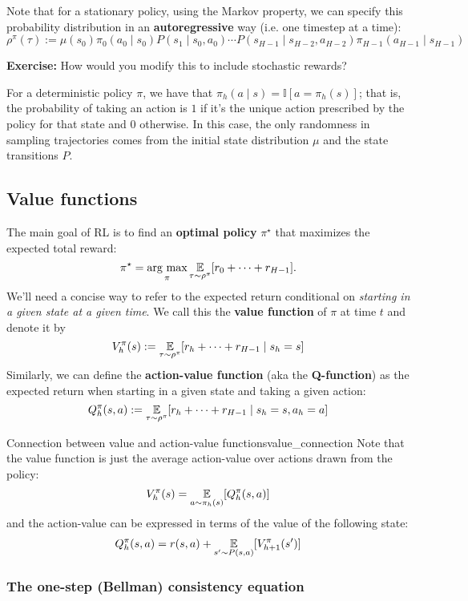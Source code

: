 \documentclass[../main/main]{subfiles}
\begin{document}
Note that for a stationary policy, using the Markov property, we can specify this probability distribution in an \textbf{autoregressive} way (i.e. one timestep at a time):
\[
    \rho^{\pi}(\tau) := \mu(s_0) \pi_0(a_0 \mid s_0) P(s_1 \mid s_0, a_0) \cdots P(s_{H-1} \mid s_{H-2}, a_{H-2}) \pi_{H-1}(a_{H-1} \mid s_{H-1})
\]

\textbf{Exercise:} How would you modify this to include stochastic rewards?

For a deterministic policy $\pi$, we have that $\pi_h(a \mid s) = \mathbb{I}[a = \pi_h(s)]$; that is, the probability of taking an action is $1$ if it's the unique action prescribed by the policy for that state and $0$ otherwise. In this case, the only randomness in sampling trajectories comes from the initial state distribution $\mu$ and the state transitions $P$.

\subsection{Value functions}

The main goal of RL is to find an \textbf{optimal policy} $\pi^\star$ that maximizes the expected total reward:
\[
    \pi^{\star} = \operatorname*{\textrm{arg\ max}}_{\pi} \operatorname*{\mathbb{E}}_{\tau \sim \rho^\pi} [r_0 + \cdots + r_{H-1}].
\]
We'll need a concise way to refer to the expected return conditional on \emph{starting in a given state at a given time}. We call this the \textbf{value function} of $\pi$ at time $t$ and denote it by
\[
    V_h^\pi(s) := \operatorname*{\mathbb{E}}_{\tau \sim \rho^\pi} [r_h + \cdots + r_{H-1} \mid s_h = s]
\]
Similarly, we can define the \textbf{action-value function} (aka the \textbf{Q-function}) as the expected return when starting in a given state and taking a given action:
\[
    Q_h^\pi(s, a) := \operatorname*{\mathbb{E}}_{\tau \sim \rho^\pi} [r_h + \cdots + r_{H-1} \mid s_h = s, a_h = a]
\]

\begin{remark}{Connection between value and action-value functions}{value_connection}
    Note that the value function is just the average action-value over actions drawn from the policy:
    \[
        V_h^\pi(s) = \operatorname*{\mathbb{E}}_{a \sim \pi_h(s)} [Q_h^\pi(s, a)]
    \]
    and the action-value can be expressed in terms of the value of the following state:
    \[
        Q_h^\pi(s, a) = r(s, a) + \operatorname*{\mathbb{E}}_{s' \sim P(s, a)} [V_{h+1}^\pi(s')]
    \]
\end{remark}

\subsubsection{The one-step (Bellman) consistency equation}
\end{document}
